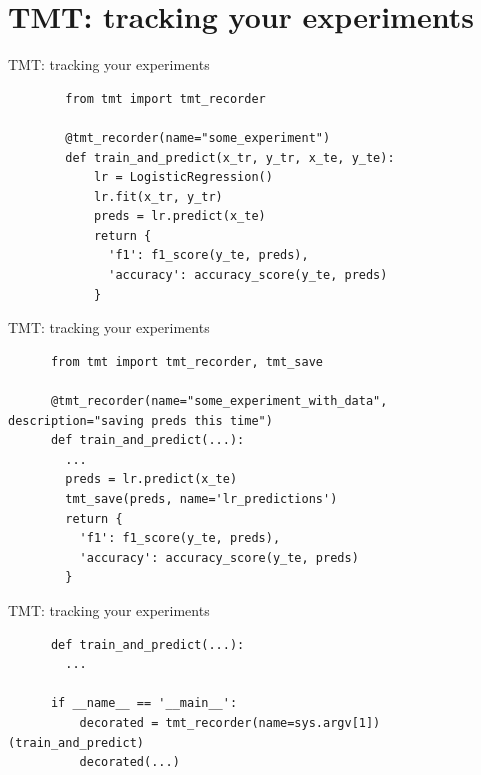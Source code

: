 \documentclass[aspectratio=169,xcolor={dvipsnames}]{beamer}
\begin{document}
  \section{TMT: tracking your experiments}
  \begin{frame}[fragile]{TMT: tracking your experiments}
      \begin{verbatim}
        from tmt import tmt_recorder

        @tmt_recorder(name="some_experiment")
        def train_and_predict(x_tr, y_tr, x_te, y_te):
            lr = LogisticRegression()
            lr.fit(x_tr, y_tr)
            preds = lr.predict(x_te)
            return {
              'f1': f1_score(y_te, preds), 
              'accuracy': accuracy_score(y_te, preds)
            }
      \end{verbatim}
  \end{frame}
  \begin{frame}[fragile]{TMT: tracking your experiments}
    \begin{verbatim}
      from tmt import tmt_recorder, tmt_save

      @tmt_recorder(name="some_experiment_with_data", description="saving preds this time")
      def train_and_predict(...):
        ...
        preds = lr.predict(x_te)
        tmt_save(preds, name='lr_predictions')
        return {
          'f1': f1_score(y_te, preds), 
          'accuracy': accuracy_score(y_te, preds)
        }
    \end{verbatim}
  \end{frame}
  \begin{frame}[fragile]{TMT: tracking your experiments}
    \begin{verbatim}
      def train_and_predict(...):
        ...

      if __name__ == '__main__':
          decorated = tmt_recorder(name=sys.argv[1])(train_and_predict)
          decorated(...)
    \end{verbatim}
  \end{frame}
\end{document}
